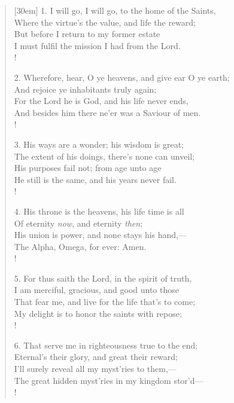 			\begin{verse}[30em]
				1. I will go, I will go, to the home of the Saints, \\
				Where the virtue's the value, and life the reward; \\
				But before I return to my former estate \\
				I must fulfil the mission I had from the Lord. \\!
				
			\begin{altverse}
			
				2. Wherefore, hear, O ye heavens, and give ear O ye earth; \\
				And rejoice ye inhabitants truly again; \\
				For the Lord he is God, and his life never ends, \\
				And besides him there ne'er was a Saviour of men. \\!
				
				3. His ways are a wonder; his wisdom is great; \\
				The extent of his doings, there's none can unveil; \\
				His purposes fail not; from age unto age \\
				He still is the same, and his years never fail. \\!
				 
				4. His throne is the heavens, his life time is all \\ 
				Of eternity \textit{now}, and eternity \textit{then}; \\ 
				His union is power, and none stays his hand,--- \\ 
				The Alpha, Omega, for ever: Amen. \\!
				 
				5. For thus saith the Lord, in the spirit of truth, \\ 
				I am merciful, gracious, and good unto those \\ 
				That fear me, and live for the life that's to come; \\ 
				My delight is to honor the saints with repose; \\!
				 
				6. That serve me in righteousness true to the end; \\ 
				Eternal's their glory, and great their reward; \\ 
				I'll surely reveal all my myst'ries to them,--- \\ 
				The great hidden myst'ries in my kingdom stor'd--- \\!
				 

\end{altverse}
\end{verse}
